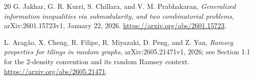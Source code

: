 \documentclass[11pt]{article}
\theoremstyle{definition}
\theoremstyle{remark}
\newcommand{\1}{\mathbf 1}
\begin{document}
\begin{thebibliography}{20}
G. Jakhar, G. R. Kurri, S. Chillara, and V. M. Prabhakaran,
\emph{Generalized information inequalities via submodularity, and two
combinatorial problems}, arXiv:2601.15723v1, January 22, 2026.
\url{https://arxiv.org/abs/2601.15723}.

L. Arag\~ao, X. Cheng, R. Filipe, R. Miyazaki, D. Peng, and Z. Yan,
\emph{Ramsey properties for tilings in random graphs},
arXiv:2605.21471v1, 2026; see Section 1.1 for the 2-density convention and
its random Ramsey context.
\url{https://arxiv.org/abs/2605.21471}.

\end{thebibliography}
\endgroup
\end{document}
